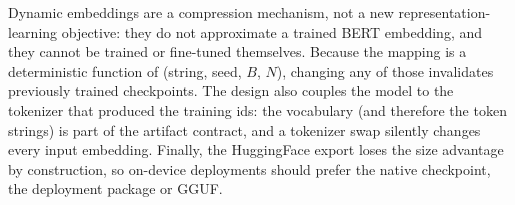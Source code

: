 Dynamic embeddings are a compression mechanism, not a new representation-learning objective: they do not approximate a trained BERT embedding, and they cannot be trained or fine-tuned themselves. Because the mapping is a deterministic function of (string, seed, $B$, $N$), changing any of those invalidates previously trained checkpoints. The design also couples the model to the tokenizer that produced the training ids: the vocabulary (and therefore the token strings) is part of the artifact contract, and a tokenizer swap silently changes every input embedding. Finally, the HuggingFace export loses the size advantage by construction, so on-device deployments should prefer the native checkpoint, the deployment package or GGUF.
